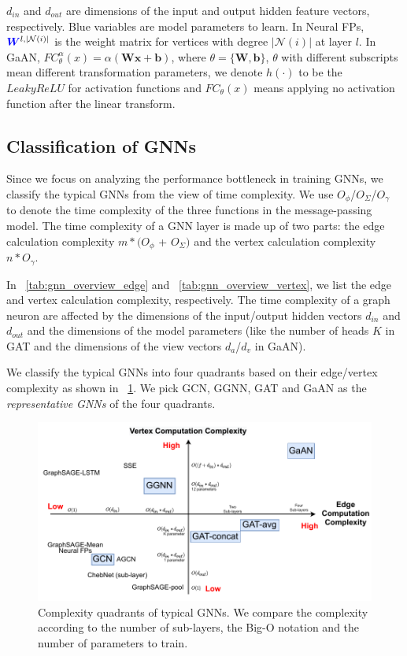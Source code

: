 \begin{table}
{		$d_{in}$ and $d_{out}$ are dimensions of the input and output hidden feature vectors, respectively.
		Blue variables are model parameters to learn.
		In Neural FPs, $\textcolor{blue}{\boldsymbol{W}}^{l, |\mathcal{N}(i)|}$ is the weight matrix for vertices with degree $|\mathcal{N}(i)|$ at layer $l$. 
		In GaAN, $FC^{\alpha}_{\theta}(x) = \alpha(\boldsymbol{W}\boldsymbol{x} + \boldsymbol{b})$, 
		where $\theta=\{\boldsymbol{W}, \boldsymbol{b}\}$, $\theta$ with different subscripts mean different transformation parameters, we denote $h(\cdot)$
		to be the $LeakyReLU$ for activation functions and $FC_{\theta}(x)$ means applying no activation function after the linear transform.}
	\label{tab:gnn_overview_vertex}
\end{table}

\subsection{Classification of GNNs}

Since we focus on analyzing the performance bottleneck in training GNNs, we classify the typical GNNs from the view of time complexity.
We use $O_\phi$/$O_\Sigma$/$O_\gamma$ to denote the time complexity of the three functions in the message-passing model.
The time complexity of a GNN layer is made up of two parts: the edge calculation complexity $m * (O_\phi$ + $O_\Sigma)$ and the vertex calculation complexity $n * O_\gamma$.

In \tablename~\ref{tab:gnn_overview_edge} and \tablename~\ref{tab:gnn_overview_vertex}, we list the edge and vertex calculation complexity, respectively.
The time complexity of a graph neuron are affected by the dimensions of the input/output hidden vectors $d_{in}$ and $d_{out}$ and the dimensions of the model parameters (like the number of heads $K$ in GAT and the dimensions of the view vectors $d_a$/$d_v$ in GaAN).

We classify the typical GNNs into four quadrants based on their edge/vertex complexity as shown in \figurename~\ref{fig:gnn_complexity_quadrant}. We pick GCN, GGNN, GAT and GaAN as the \emph{representative GNNs} of the four quadrants.

\begin{figure}
	\centering
	\includegraphics[width=0.7\columnwidth]{figs/illustration/GNN_complexity_quadrant.pdf}
	\caption{Complexity quadrants of typical GNNs. We compare the complexity according to the number of sub-layers, the Big-O notation and the number of parameters to train.}
	\label{fig:gnn_complexity_quadrant}
\end{figure}

